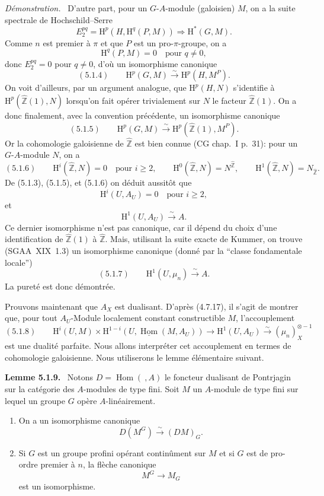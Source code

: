 \documentclass[11pt]{article}
\newenvironment{statement}[1]{\par\medskip\noindent\textbf{#1.}\ }{\par\medskip}
\newenvironment{prooftext}[1][Proof]{\par\noindent\emph{#1.}\ }{\par\medskip}
\renewcommand{\H}{\mathrm{H}}
\DeclareMathOperator{\Hom}{Hom}
\newcommand{\Z}{\mathbb{Z}}
\providecommand{\uHom}{\underline{\Hom}}
\providecommand{\Hom}{\operatorname{Hom}}
\providecommand{\Z}{\mathbb Z}
\providecommand{\Hom}{\operatorname{Hom}}
\begin{document}
\begin{prooftext}[Démonstration]
D'autre part, pour un $G$-$A$-module (galoisien) $M$, on a la suite spectrale de Hochschild--Serre
\[
E_2^{pq}=\H^p(H,\H^q(P,M))\Longrightarrow \H^{*}(G,M).
\]
Comme $n$ est premier à $\pi$ et que $P$ est un pro-$\pi$-groupe, on a
\[
\H^q(P,M)=0\quad\text{pour }q\ne0,
\]
donc $E_2^{pq}=0$ pour $q\ne0$, d'où un isomorphisme canonique
\[
(5.1.4)\qquad \H^p(G,M)\xrightarrow{\sim}\H^p(H,M^P).
\]
On voit d'ailleurs, par un argument analogue, que $\H^p(H,N)$ s'identifie à $\H^p(\widehat{\Z}(1),N)$ lorsqu'on fait opérer trivialement sur $N$ le facteur $\widehat{\Z}(1)$. On a donc finalement, avec la convention précédente, un isomorphisme canonique
\[
(5.1.5)\qquad \H^p(G,M)\xrightarrow{\sim}\H^p(\widehat{\Z}(1),M^P).
\]
Or la cohomologie galoisienne de $\widehat{\Z}$ est bien connue (CG chap.~I p.~31): pour un $G$-$A$-module $N$, on a
\[
(5.1.6)\qquad
\H^i(\widehat{\Z},N)=0\quad\text{pour }i\geqslant2,
\qquad
\H^0(\widehat{\Z},N)=N^{\widehat{\Z}},
\qquad
\H^1(\widehat{\Z},N)=N_{\widehat{\Z}}.
\]
De (5.1.3), (5.1.5), et (5.1.6) on déduit aussitôt que
\[
\H^i(U,A_U)=0\quad\text{pour }i\geqslant2,
\]
et
\[
\H^1(U,A_U)\xrightarrow{\sim}A.
\]
Ce dernier isomorphisme n'est pas canonique, car il dépend du choix d'une identification de $\widehat{\Z}(1)$ à $\widehat{\Z}$. Mais, utilisant la suite exacte de Kummer, on trouve (SGAA~XIX~1.3) un isomorphisme canonique (donné par la ``classe fondamentale locale'')
\[
(5.1.7)\qquad \H^1(U,\mu_n)\xrightarrow{\sim}A.
\]
La pureté est donc démontrée.

Prouvons maintenant que $A_X$ est dualisant. D'après (4.7.17), il s'agit de montrer que, pour tout $A_U$-Module localement constant constructible $M$, l'accouplement
\[
(5.1.8)\qquad \H^i(U,M)\times\H^{1-i}(U,\uHom(M,A_U))\longrightarrow \H^1(U,A_U)\xrightarrow{\sim}(\mu_n)_X^{\otimes -1}%
\]
est une dualité parfaite. Nous allons interpréter cet accouplement en termes de cohomologie galoisienne. Nous utiliserons le lemme élémentaire suivant.
\end{prooftext}

\begin{statement}{Lemme 5.1.9}
Notons $D=\Hom(\ ,A)$ le foncteur dualisant de Pontrjagin sur la catégorie des $A$-modules de type fini. Soit $M$ un $A$-module de type fini sur lequel un groupe $G$ opère $A$-linéairement.
\begin{enumerate}[label=(\roman*)]
\item On a un isomorphisme canonique
\[
D(M^G)\xrightarrow{\sim}(DM)_G.
\]
\item Si $G$ est un groupe profini opérant continûment sur $M$ et si $G$ est de pro-ordre premier à $n$, la flèche canonique
\[
M^G\longrightarrow M_G
\]
est un isomorphisme.
\end{enumerate}
\end{statement}
\end{document}

